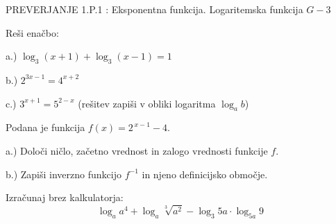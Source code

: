 \documentclass[a4paper,12pt]{letter}
\renewcommand{\headrulewidth}{3pt}
\renewcommand{\headrulewidth}{0.3pt}
\newcounter{tocke}
\begin{document}
\pagestyle{fancy}
\renewcommand\headrulewidth{0pt}
\lhead{}\chead{}\rhead{}
\rfoot{\vspace*{-2\baselineskip}}
\renewcommand{\vec}{\overrightarrow}
\everymath{\displaystyle}

\begin{minipage}{20cm}
\begin{bclogo}[couleur=brown!40,
  arrondi=0,ombre=true, couleurOmbre=gray!50,
logo =\bcplume,
  noborder=true]
{\textrm{{\Large{PREVERJANJE 1.P.1} \Huge{}:
\large{Eksponentna funkcija. Logaritemska funkcija} \hfill $G-3$}}}
\end{bclogo}
\end{minipage}
\begin{minipage}{20cm}
\end{minipage}


\def\tockeA{4+4+4}
\begin{naloga}[\hfill $\tockeA$] \addtocounter{tocke}{\numexpr\tockeA\relax}
Re\v{s}i ena\v{c}bo:

a.) $\log_3(x+1)+\log_3(x-1)=1$

b.) $2^{3x-1}=4^{x+2}$

c.) $3^{x+1}=5^{2-x}$ \quad (re\v{s}itev zapi\v{s}i v obliki logaritma $\log_a b$)
\end{naloga}\newpage

\def\tockeB{2+1+1+3}
\begin{naloga}[\hfill $\tockeB$] \addtocounter{tocke}{\numexpr\tockeB\relax}
Podana je funkcija $f(x)=2^{\,x-1}-4$.

a.) Dolo\v{c}i ni\v{c}lo, za\v{c}etno vrednost in zalogo vrednosti funkcije $f$.

b.) Zapi\v{s}i inverzno funkcijo $f^{-1}$ in njeno definicijsko obmo\v{c}je.
\end{naloga}\newpage

\def\tockeC{4}
\begin{naloga}[\hfill $\tockeC$] \addtocounter{tocke}{\numexpr\tockeC\relax}
Izra\v{c}unaj brez kalkulatorja:
$$\log_a a^4+\log_a \sqrt[3]{a^2}-\log_3 5a\cdot\log_{5a} 9$$
\end{naloga}\newpage
\end{document}
